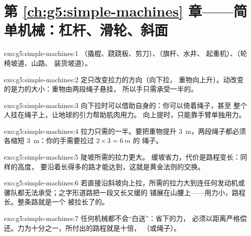 \section*{第 \ref{ch:g5:simple-machines} 章——简单机械：杠杆、滑轮、斜面}

\begin{solution}{exo:g5:simple-machines:1}
（撬棍、跷跷板、剪刀）、（旗杆、水井、
起重机）、（轮椅坡道、山路、
装货坡道）。
\end{solution}

\begin{solution}{exo:g5:simple-machines:2}
定只改变拉力的方向（向下拉，
重物向上升）。动改变的是力的大小：重物由两段绳子悬挂，
所以手只需承受一半的。
\end{solution}

\begin{solution}{exo:g5:simple-machines:3}
向下拉时可以借助自身的：你可以倚着绳子，甚至
整个人挂在绳子上，让地球的引力帮助肌肉用力。
向上提时，只能靠手臂单独用力。
\end{solution}

\begin{solution}{exo:g5:simple-machines:4}
拉力只需的一半。要把重物提升 \qty{3}{m}，两段绳子都必须
各缩短 \qty{3}{m}：你的手需要拉过 $2 \times 3 = \qty{6}{m}$ 的
绳子。
\end{solution}

\begin{solution}{exo:g5:simple-machines:5}
陡坡所需的拉力更大。
缓坡省力，代价是路程变长：同样的高度，
要沿着长得多的路才能达到，这就是黄金法则的交换。
\end{solution}

\begin{solution}{exo:g5:simple-machines:6}
若直接沿斜坡向上拉，所需的拉力大到连任何发动机或
骡队都无法承受；之字形道路把一段又长又缓的
铺展在山腰上——用力小，路程长。整条路就是一个
被拉长了的。
\end{solution}

\begin{solution}{exo:g5:simple-machines:7}
任何机械都不会“白送”：省下的力，
必须以距离严格偿还。力为十分之一，所付出的路程就是十倍，
（或绳子）。
\end{solution}

